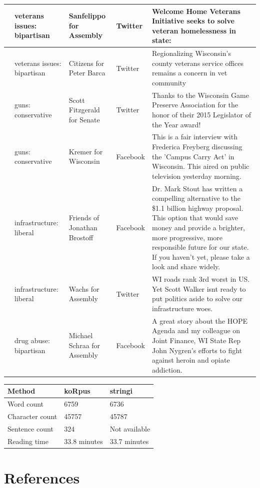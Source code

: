 \documentclass[12pt,]{article}
\begin{document}
\begin{longtable}[t]{>{\raggedright\arraybackslash}p{.65in}|>{\raggedright\arraybackslash}p{.6in}|>{\raggedright\arraybackslash}p{.7in}|>{\raggedright\arraybackslash}p{.6in}|>{\raggedright\arraybackslash}p{3in}}
\hline
6 & veterans issues: bipartisan & Sanfelippo for Assembly & Twitter & Welcome Home Veterans Initiative seeks to solve veteran homelessness in state:\\
\hline
7 & veterans issues: bipartisan & Citizens for Peter Barca & Twitter & Regionalizing Wisconsin's county veterans service offices remains a concern in vet community\\
\hline
8 & guns: conservative & Scott Fitzgerald for Senate & Twitter & Thanks to the Wisconsin Game Preserve Association for the honor of their 2015 Legislator of the Year award!\\
\hline
9 & guns: conservative & Kremer for Wisconsin & Facebook & This is a fair interview with Frederica Freyberg discussing the 'Campus Carry Act' in Wisconsin.  This aired on public television yesterday morning.\\
\hline
10 & infrastructure: liberal & Friends of Jonathan Brostoff & Facebook & Dr. Mark Stout has written a compelling alternative to the \$1.1 billion highway proposal. This option that would save money and provide a brighter, more progressive, more responsible future for our state. If you haven't yet, please take a look and share widely.\\
\hline
11 & infrastructure: liberal & Wachs for Assembly & Twitter & WI roads rank 3rd worst in US. Yet Scott Walker isnt ready to put politics aside to solve our infrastructure woes.\\
\hline
12 & drug abuse: bipartisan & Michael Schraa for Assembly & Facebook & A great story about the HOPE Agenda and my colleague on Joint Finance, WI State Rep John Nygren's efforts to fight against heroin and opiate addiction.\\
\hline
\end{longtable}

\begin{tabular}{l|l|l}
\hline
Method & koRpus & stringi\\
\hline
Word count & 6759 & 6736\\
\hline
Character count & 45757 & 45787\\
\hline
Sentence count & 324 & Not available\\
\hline
Reading time & 33.8 minutes & 33.7 minutes\\
\hline
\end{tabular}

\hypertarget{references}{%
\section*{References}\label{references}}
\end{document}
